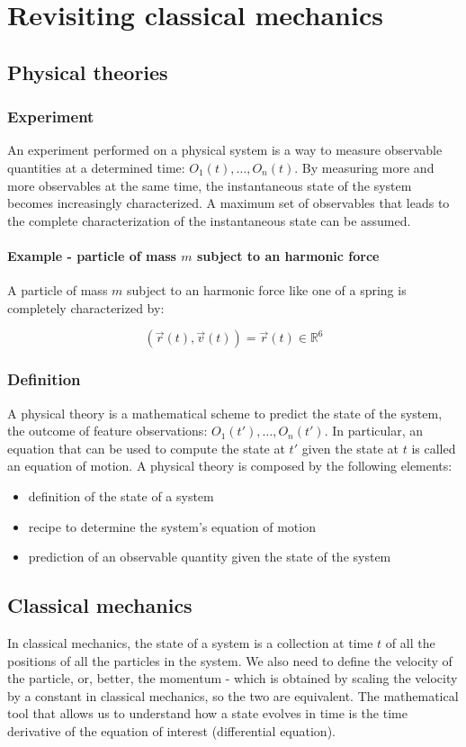 \chapter{Revisiting classical mechanics}

\section{Physical theories}

  \subsection{Experiment}
  An experiment performed on a physical system is a way to measure observable quantities at a determined time: $O_1(t), \dots, O_n(t)$.
  By measuring more and more observables at the same time, the instantaneous state of the system becomes increasingly characterized.
  A maximum set of observables that leads to the complete characterization of the instantaneous state can be assumed.

    \subsubsection{Example - particle of mass $m$ subject to an harmonic force}
    A particle of mass $m$ subject to an harmonic force like one of a spring is completely characterized by: 
    
    $$(\vec{r}(t),\vec{v}(t))=\vec{r}(t)\in \mathbb{R}^6$$

  \subsection{Definition}
  A physical theory is a mathematical scheme to predict the state of the system, the outcome of feature observations: $O_1(t'), \dots, O_n(t')$.
  In particular, an equation that can be used to compute the state at $t'$ given the state at $t$ is called an equation of motion.
  A physical theory is composed by the following elements:
  \begin{itemize}
    \item definition of the state of a system
    \item recipe to determine the system's equation of motion
    \item prediction of an observable quantity given the state of the system
   \end{itemize}
   

\section{Classical mechanics}
In classical mechanics, the state of a system is a collection at time $t$ of all the positions of all the particles in the system. We also need to define the velocity of the particle, or, better, the momentum - which is obtained by scaling the velocity by a constant in classical mechanics, so the two are equivalent. The mathematical tool that allows us to understand how a state evolves in time is the time derivative of the equation of interest (differential equation).

